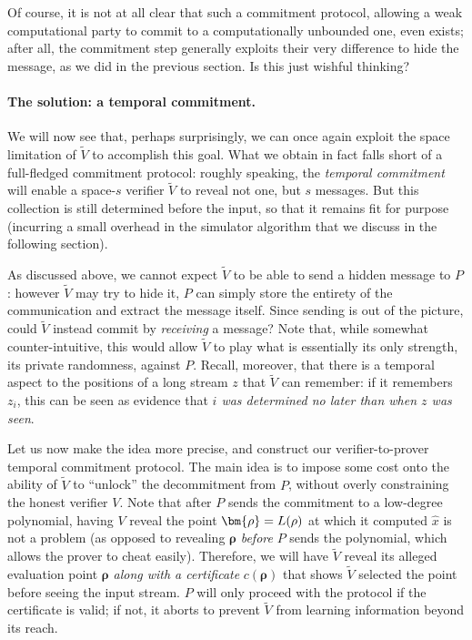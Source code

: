 \documentclass[10pt,a4paper]{article}
\newif\iflipics\lipicsfalse
\theoremstyle{definition}
\newcommand{\vcommitstring}{z}
\newcommand{\fingerprinttuple}{\bm{\rho}}
\renewcommand{\line}{L}
\def\rfe#1{
    \ifnum#1=1
        \rho
    \else
    \ifnum#1=2
        \sigma
    \else
    \fi\fi
}
\begin{document}
    Of course, it is not at all clear that such a commitment protocol, allowing a weak computational party to commit to a computationally unbounded one, even exists; after all, the commitment step generally exploits their very difference to hide the message, as we did in the previous section. Is this just wishful thinking?
    
    \paragraph*{The solution: a temporal commitment\iflipics\else.\fi} We will now see that, perhaps surprisingly, we can once again exploit the space limitation of $\widetilde V$ to accomplish this goal. What we obtain in fact falls short of a full-fledged commitment protocol: roughly speaking, the \emph{temporal  commitment} will enable a space-$s$ verifier $\widetilde V$ to reveal not one, but $s$ messages. But this collection is still determined before the input, so that it remains fit for purpose (incurring a small overhead in the simulator algorithm that we discuss in the following section).
    
    As discussed above, we cannot expect $\widetilde V$ to be able to send a hidden message to $P$: however $\widetilde V$ may try to hide it, $P$ can simply store the entirety of the communication and extract the message itself. Since sending is out of the picture, could $\widetilde V$ instead commit by \emph{receiving} a message? Note that, while somewhat counter-intuitive, this would allow $\widetilde V$ to play what is essentially its only strength, its private randomness, against $P$. Recall, moreover, that there is a temporal aspect to the positions of a long stream $\vcommitstring$ that $\widetilde V$ can remember: if it remembers $\vcommitstring_i$, this can be seen as evidence that \emph{$i$ was determined no later than when $\vcommitstring$ was seen}.
    
    Let us now make the idea more precise, and construct our verifier-to-prover temporal commitment protocol. The main idea is to impose some cost onto the ability of $\widetilde V$ to ``unlock'' the decommitment from $P$, without overly constraining the honest verifier $V$. Note that after $P$ sends the commitment to a low-degree polynomial, having $V$ reveal the point $\fingerprinttuple = \line(\rfe1)$ at which it computed $\hat x$ is not a problem (as opposed to revealing $\fingerprinttuple$ \emph{before} $P$ sends the polynomial, which allows the prover to cheat easily). Therefore, we will have $\widetilde V$ reveal its alleged evaluation point $\fingerprinttuple$ \emph{along with a certificate} $c(\fingerprinttuple)$ that shows $\widetilde V$ selected the point before seeing the input stream. $P$ will only proceed with the protocol if the certificate is valid; if not, it aborts to prevent $\widetilde V$ from learning information beyond its reach.
    
\end{document}
